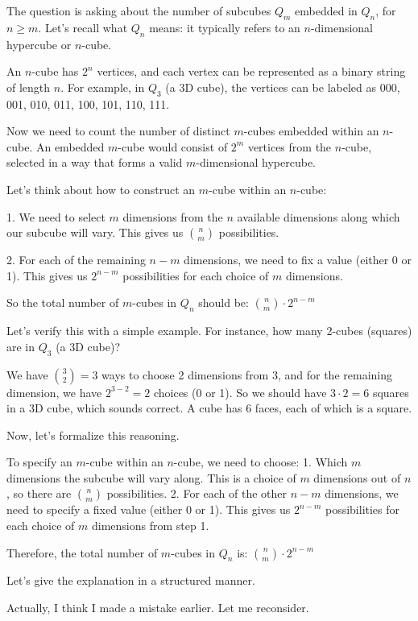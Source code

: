 \documentclass[12p]{article}
\newcounter{reasoningcounter}
\newenvironment{reasoning}[1][]
{\refstepcounter{reasoningcounter}%
\begin{tcolorbox}[
    title=Reasoning \thereasoningcounter: #1,
    colback=white, %
    colframe=gray,
    coltext=black, %
    fonttitle=\bfseries\normalsize,
    top=2mm,
    bottom=2mm,
    enlarge top initially by=5mm
]
\small
}
{\end{tcolorbox}}
\begin{document}
\begin{reasoning}
The question is asking about the number of subcubes $Q_m$ embedded in $Q_n$, for $n \geq m$. Let's recall what $Q_n$ means: it typically refers to an $n$-dimensional hypercube or $n$-cube. 

An $n$-cube has $2^n$ vertices, and each vertex can be represented as a binary string of length $n$. For example, in $Q_3$ (a 3D cube), the vertices can be labeled as 000, 001, 010, 011, 100, 101, 110, 111.

Now we need to count the number of distinct $m$-cubes embedded within an $n$-cube. An embedded $m$-cube would consist of $2^m$ vertices from the $n$-cube, selected in a way that forms a valid $m$-dimensional hypercube.

Let's think about how to construct an $m$-cube within an $n$-cube:

1. We need to select $m$ dimensions from the $n$ available dimensions along which our subcube will vary. This gives us $\binom{n}{m}$ possibilities.

2. For each of the remaining $n-m$ dimensions, we need to fix a value (either 0 or 1). This gives us $2^{n-m}$ possibilities for each choice of $m$ dimensions.

So the total number of $m$-cubes in $Q_n$ should be:
$\binom{n}{m} \cdot 2^{n-m}$

Let's verify this with a simple example. For instance, how many 2-cubes (squares) are in $Q_3$ (a 3D cube)?

We have $\binom{3}{2} = 3$ ways to choose 2 dimensions from 3, and for the remaining dimension, we have $2^{3-2} = 2$ choices (0 or 1). So we should have $3 \cdot 2 = 6$ squares in a 3D cube, which sounds correct. A cube has 6 faces, each of which is a square.

Now, let's formalize this reasoning.

To specify an $m$-cube within an $n$-cube, we need to choose:
1. Which $m$ dimensions the subcube will vary along. This is a choice of $m$ dimensions out of $n$, so there are $\binom{n}{m}$ possibilities.
2. For each of the other $n-m$ dimensions, we need to specify a fixed value (either 0 or 1). This gives us $2^{n-m}$ possibilities for each choice of $m$ dimensions from step 1.

Therefore, the total number of $m$-cubes in $Q_n$ is:
$\binom{n}{m} \cdot 2^{n-m}$

Let's give the explanation in a structured manner.

Actually, I think I made a mistake earlier. Let me reconsider.


\end{reasoning}
\end{document}
